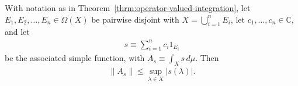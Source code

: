 \begin{proposition}
    \label{prpstn:integral-norm-bound-simple}
    \leanok
    With notation as in Theorem~\ref{thrm:operator-valued-integration}, let $E_1, E_2, \ldots, E_n \in \Omega(X)$ be pairwise disjoint with $X = \bigcup_{i=1}^n E_i$, let $c_1, \ldots, c_n \in \mathbb{C}$, and let
    \begin{align}
        s \equiv \sum_{i=1}^n c_i 1_{E_i}
    \end{align}
    be the associated simple function, with $A_s \equiv \int_X s \, d\mu$. Then
    \begin{align}
        \left\| A_s \right\| \le \sup\limits_{\lambda \in X} \lvert s(\lambda) \rvert.
    \end{align}
\end{proposition}
